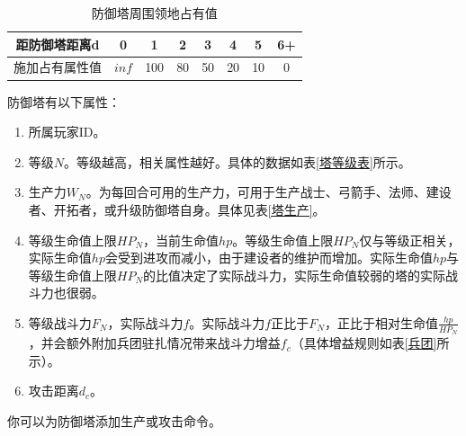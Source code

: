 \documentclass[a4paper,4pt]{article}
\begin{document}
\begin{table}[htbp]
  \centering
  \caption{防御塔周围领地占有值}
  \begin{tabular}{c|c|c|c|c|c|c|c}
    \hline
    距防御塔距离d  & 0     & 1   & 2  & 3  & 4  & 5  & 6+ \bigstrut \\
    \hline
    施加占有属性值 & $inf$ & 100 & 80 & 50 & 20 & 10 & 0 \bigstrut  \\
    \hline
  \end{tabular}%
  \label{领地}%
\end{table}%

防御塔有以下属性：
\begin{enumerate}[fullwidth, itemindent=2em, label=(\arabic*)]
  \item 所属玩家ID。
  \item 等级$N$。等级越高，相关属性越好。具体的数据如表\ref{塔等级表}所示。
  \item 生产力$W_N$。为每回合可用的生产力，可用于生产战士、弓箭手、法师、建设者、开拓者，或升级防御塔自身。具体见表\ref{塔生产}。
  \item 等级生命值上限$HP_N$，当前生命值$hp$。等级生命值上限$HP_N$仅与等级正相关，实际生命值$hp$会受到进攻而减小，由于建设者的维护而增加。实际生命值$hp$与等级生命值上限$HP_N$的比值决定了实际战斗力，实际生命值较弱的塔的实际战斗力也很弱。
  \item 等级战斗力$F_N$，实际战斗力$f$。实际战斗力$f$正比于$F_N$，正比于相对生命值$\frac{hp}{HP_N}$，并会额外附加兵团驻扎情况带来战斗力增益$f_c$（具体增益规则如表\ref{兵团}所示）。
  \item 攻击距离$d_c$。
\end{enumerate}
\par

你可以为防御塔添加生产或攻击命令。
\end{document}
